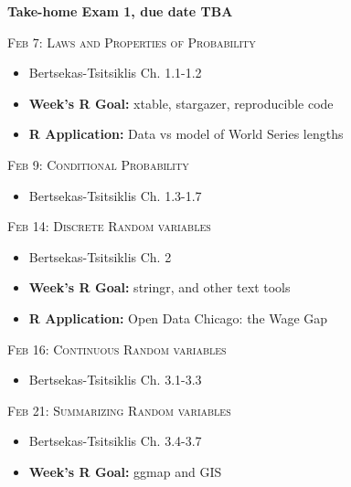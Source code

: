 \documentclass[11pt]{article}
\begin{document}
\noindent \textbf{Take-home Exam 1, due date TBA}



\noindent \textsc{Feb  7: Laws and Properties of Probability}

\begin{itemize}

\item Bertsekas-Tsitsiklis Ch. 1.1-1.2 

\item  {\bf Week's R Goal:} xtable, stargazer, reproducible code
 \item  {\bf R Application:} Data vs model of World Series lengths 
\end{itemize}

\noindent \textsc{Feb 9: Conditional Probability}

\begin{itemize}

\item Bertsekas-Tsitsiklis Ch. 1.3-1.7

\end{itemize}

\noindent \textsc{Feb 14: Discrete Random variables }

\begin{itemize}

 \item Bertsekas-Tsitsiklis Ch. 2  
 
 \item  {\bf Week's R Goal:} stringr, and other text tools
 \item  {\bf R Application:}  Open Data Chicago: the Wage Gap

\end{itemize}


\noindent \textsc{Feb 16: Continuous Random variables}

\begin{itemize}
\item Bertsekas-Tsitsiklis Ch. 3.1-3.3 
\end{itemize}


\noindent \textsc{Feb 21: Summarizing Random variables}

\begin{itemize}
\item Bertsekas-Tsitsiklis Ch. 3.4-3.7 

\item  {\bf Week's R Goal:} ggmap and GIS
\end{itemize}
\end{document}
